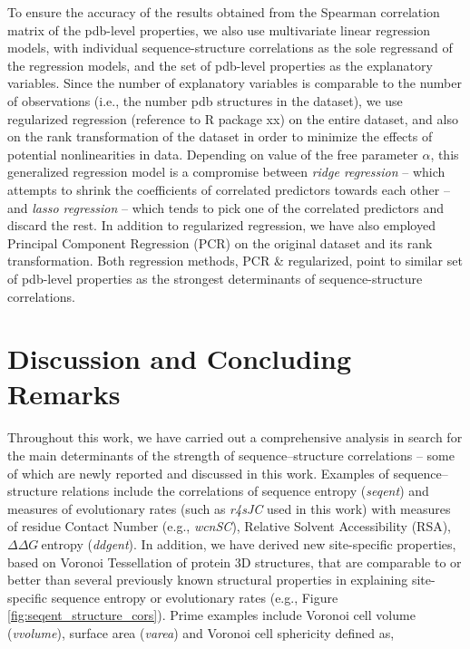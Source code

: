 \documentclass[11pt]{article}
\newcommand{\ddg}{$\Delta\Delta G~$}
\begin{document}
        To ensure the accuracy of the results obtained from the Spearman correlation matrix of the pdb-level properties, we also use multivariate linear regression models, with individual sequence-structure correlations as the sole regressand of the regression models, and the set of pdb-level properties as the explanatory variables.  Since the number of explanatory variables is comparable to the number of observations (i.e., the number pdb structures in the dataset), we use regularized regression (reference to R package xx) on the entire dataset, and also on the rank transformation of the dataset in order to minimize the effects of potential nonlinearities in data. Depending on value of the free parameter $\alpha$, this generalized regression model is a compromise between {\it ridge regression} -- which attempts to shrink the coefficients of correlated predictors towards each other -- and {\it lasso regression} -- which tends to pick one of the correlated predictors and discard the rest. In addition to regularized regression, we have also employed Principal Component Regression (PCR) on the original dataset and its rank transformation. Both regression methods, PCR \& regularized, point to similar set of pdb-level properties as the strongest determinants of sequence-structure correlations.



\section{Discussion and Concluding Remarks}
\label{sec:dcr}

        Throughout this work, we have carried out a comprehensive analysis in search for the main determinants of the strength of sequence--structure correlations -- some of which are newly reported and discussed in this work. Examples of sequence--structure relations include the correlations of sequence entropy ({\it seqent}) and measures of evolutionary rates (such as {\it r4sJC} used in this work) with measures of residue Contact Number (e.g., {\it wcnSC}), Relative Solvent Accessibility (RSA), \ddg entropy ({\it ddgent}). In addition, we have derived new site-specific properties, based on Voronoi Tessellation of protein 3D structures, that are comparable to or better than several previously known structural properties in explaining site-specific sequence entropy or evolutionary rates (e.g., Figure \ref{fig:seqent_structure_cors}). Prime examples include Voronoi cell volume ({\it vvolume}), surface area ({\it varea}) and Voronoi cell sphericity defined as,
\end{document}
